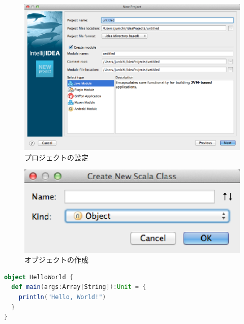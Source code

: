 \documentclass[10pt]{jarticle}
\begin{document}
\begin{figure}[hb]
  \centering
  \caption{プロジェクトの設定}
  \includegraphics[scale=0.5]{img/new_project.eps}
\end{figure}

\begin{figure}[hb]
  \centering
  \caption{オブジェクトの作成}
  \includegraphics[scale=0.5]{img/create_new_scala_class.eps}
\end{figure}

\begin{lstlisting}[language=scala, label=src:helloworld, caption=HelloWorld.scala]
object HelloWorld {
  def main(args:Array[String]):Unit = {
    println("Hello, World!")
  }
}
\end{lstlisting}
\end{document}
